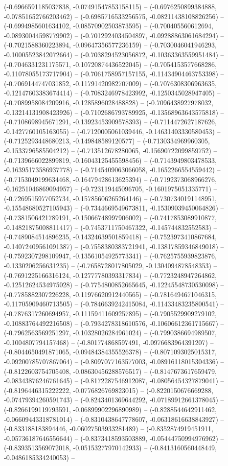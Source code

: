 (-0.6966591185037838, -0.07491547853158115) -- (-0.6976250899384888, -0.07851652766203462) -- (-0.6985716533256575, -0.08211438108826256) -- (-0.6994985601634102, -0.08570902503873595) -- (-0.700405560612694, -0.08930044598779902) -- (-0.7012924034504897, -0.09288863061684294) -- (-0.7021588360223894, -0.09647356577236159) -- (-0.7030046041946293, -0.10005523842072664) -- (-0.7038294523056872, -0.10363363559951484) -- (-0.7046331231175571, -0.10720874436522045) -- (-0.7054153577668286, -0.11078055173717904) -- (-0.7061758957157155, -0.11434904463753398) -- (-0.7069144747031852, -0.11791420982707009) -- (-0.7076308306963635, -0.12147603383674414) -- (-0.7083246978423992, -0.1250345028947405) -- (-0.7089958084209916, -0.1285896028488828) -- (-0.7096438927978032, -0.13214131908423926) -- (-0.7102686793789925, -0.13568963643575818) -- (-0.7108698945671291, -0.13923453909578393) -- (-0.7114472627187626, -0.1427760105163055) -- (-0.7120005061039446, -0.14631403330580453) -- (-0.7125293448680213, -0.149848589120577) -- (-0.7130334969960305, -0.1533796585504212) -- (-0.713512678280065, -0.15690722099859752) -- (-0.7139666022899819, -0.16043125455598456) -- (-0.7143949803478533, -0.16395173586937778) -- (-0.7145409063066058, -0.1652266554559442) -- (-0.7153049199634468, -0.16479428613625394) -- (-0.7192373068966276, -0.16251046869094957) -- (-0.723119445096705, -0.1601975051335771) -- (-0.7269515977052734, -0.15785606265264146) -- (-0.7307340191148951, -0.15548680527105943) -- (-0.7344669549673811, -0.15309039450064826) -- (-0.7381506421789191, -0.15066748997906002) -- (-0.7417853089910877, -0.14821875008811417) -- (-0.7453711750467322, -0.145744832552583) -- (-0.7489084514896235, -0.14324639501859418) -- (-0.7523973410867684, -0.14072409561091387) -- (-0.7558380383721941, -0.13817859346849018) -- (-0.7592307298109947, -0.13561054925773341) -- (-0.7625755939823876, -0.1330206256631235) -- (-0.7658728017805029, -0.1304094878548353) -- (-0.7691225166316124, -0.12777780393317834) -- (-0.7723248947264862, -0.12512624534975028) -- (-0.7754800852665645, -0.12245548730530098) -- (-0.7785882307226228, -0.11976620912440565) -- (-0.7816494671046315, -0.11705909460713505) -- (-0.7846639242415084, -0.11433483235800541) -- (-0.7876317260694957, -0.11159411609257895) -- (-0.7905529909279102, -0.10883764492216508) -- (-0.7934278318610576, -0.10606612361715667) -- (-0.7962563569251297, -0.10328026284961024) -- (-0.7990386694989507, -0.1004807794157468) -- (-0.801774868597491, -0.0976683964391207) -- (-0.8044650491871065, -0.09484384355526378) -- (-0.8071093025015317, -0.09200785707867064) -- (-0.8097077163577003, -0.08916118015304336) -- (-0.8122603754705408, -0.08630456288576517) -- (-0.8147673617659479, -0.08343876246761645) -- (-0.8172287546912087, -0.08056454327879041) -- (-0.8196446315222222, -0.0776826769823015) -- (-0.8220150676669288, -0.07479394260591743) -- (-0.8243401369644292, -0.07189912661378045) -- (-0.8266199119793591, -0.06899902296890989) -- (-0.8288544642911462, -0.06609443318781014) -- (-0.8310438647778607, -0.06318616638843927) -- (-0.833188183894446, -0.06027503933281489) -- (-0.8352874919451911, -0.05736187646556644) -- (-0.8373418593503889, -0.05444750994976962) -- (-0.8393513569072018, -0.05153277970142933) -- (-0.8413160560448449, -0.0486185334240053) -- 